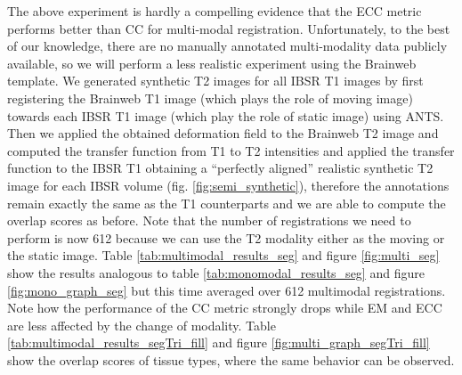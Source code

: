 The above experiment is hardly a compelling evidence that the ECC metric performs better than CC for multi-modal registration. Unfortunately, to the best of our knowledge,
there are no manually annotated multi-modality data publicly available, so we will perform a less
realistic experiment using the Brainweb template. We generated synthetic T2 images for all IBSR T1 images by first registering the Brainweb T1 image (which plays the role of
moving image) towards each IBSR T1 image (which play the role of static image) using ANTS. Then we applied the obtained deformation field to the Brainweb T2 image and computed
the transfer function from T1 to T2 intensities and applied the transfer function to the IBSR T1 obtaining a ``perfectly aligned'' realistic synthetic T2 image for each IBSR volume
(fig. \ref{fig:semi_synthetic}), therefore the annotations remain exactly the same as the T1 counterparts and we are able to compute the overlap scores as before. Note that the number
of registrations we need to perform is now 612 because we can use the T2 modality either as the moving or the static image. Table \ref{tab:multimodal_results_seg} and
figure \ref{fig:multi_seg} show the results analogous to table \ref{tab:monomodal_results_seg} and figure \ref{fig:mono_graph_seg} but this time averaged over 612
multimodal registrations. Note how the performance of the CC metric strongly drops while EM and ECC are less affected by the change of modality. Table
\ref{tab:multimodal_results_segTri_fill} and figure \ref{fig:multi_graph_segTri_fill} show the overlap scores of tissue types, where the same
behavior can be observed.\\

